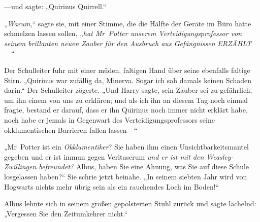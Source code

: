 —und sagte: „Quirinus Quirrell.“

„\emph{Warum},“ sagte sie, mit einer Stimme, die die Hälfte der Geräte im Büro hätte schmelzen lassen sollen, „\emph{hat Mr~Potter unserem Verteidigungsprofessor von seinem brillanten neuen Zauber für den Ausbruch aus Gefängnissen} \emph{ERZÄHLT}—“

Der Schulleiter fuhr mit einer müden, faltigen Hand über seine ebenfalls faltige Stirn. „Quirinus war zufällig da, Minerva. Sogar ich sah damals keinen Schaden darin.“ Der Schulleiter zögerte. „Und Harry sagte, sein Zauber sei zu gefährlich, um ihn einem von uns zu erklären; und als ich ihn an diesem Tag noch einmal fragte, bestand er darauf, dass er ihn Quirinus noch immer nicht erklärt habe, noch habe er jemals in Gegenwart des Verteidigungsprofessors seine okklumentischen Barrieren fallen lassen—“

„Mr~Potter ist ein \emph{Okklumentiker}? Sie haben ihm einen Unsichtbarkeitsmantel gegeben und er ist immun gegen Veritaserum \emph{und er ist mit den Weasley-Zwillingen befreundet?} Albus, haben Sie eine Ahnung, was Sie auf diese Schule losgelassen haben?“ Sie schrie jetzt beinahe. „In seinem siebten Jahr wird von Hogwarts nichts mehr übrig sein als ein rauchendes Loch im Boden!“

Albus lehnte sich in seinem großen gepolsterten Stuhl zurück und sagte lächelnd: „Vergessen Sie den Zeitumkehrer nicht.“

